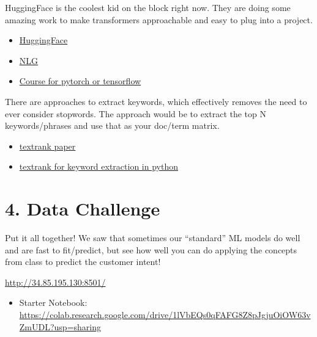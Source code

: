 \documentclass[
]{article}
\providecommand{\tightlist}{%
  \setlength{\itemsep}{0pt}\setlength{\parskip}{0pt}}
\begin{document}
HuggingFace is the coolest kid on the block right now. They are doing
some amazing work to make transformers approachable and easy to plug
into a project.

\begin{itemize}
\tightlist
\item
  \href{https://huggingface.co/}{HuggingFace}
\item
  \href{https://transformer.huggingface.co/}{NLG}
\item
  \href{https://huggingface.co/course/chapter1/1?fw=tf}{Course for
  pytorch or tensorflow}
\end{itemize}

There are approaches to extract keywords, which effectively removes the
need to ever consider stopwords. The approach would be to extract the
top N keywords/phrases and use that as your doc/term matrix.

\begin{itemize}
\tightlist
\item
  \href{https://web.eecs.umich.edu/~mihalcea/papers/mihalcea.emnlp04.pdf}{textrank
  paper}
\item
  \href{https://derwen.ai/docs/ptr/}{textrank for keyword extraction in
  python}
\end{itemize}

\hypertarget{data-challenge}{%
\section{4. Data Challenge}\label{data-challenge}}

Put it all together! We saw that sometimes our ``standard'' ML models do
well and are fast to fit/predict, but see how well you can do applying
the concepts from class to predict the customer intent!

\url{http://34.85.195.130:8501/}

\begin{itemize}
\tightlist
\item
  Starter Notebook:
  \url{https://colab.research.google.com/drive/1lVbEQs0qFAFG8Z8pJgjuOiOW63vZmUDL?usp=sharing}
\end{itemize}
\end{document}
